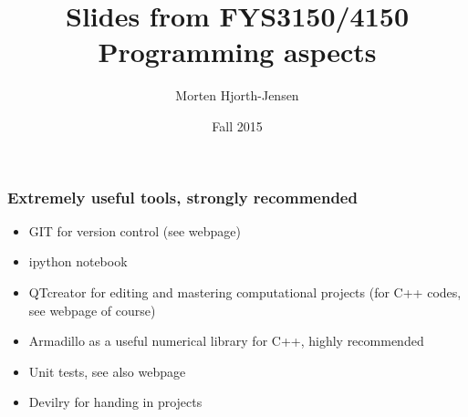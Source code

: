 \documentclass[handout]{beamer}
\newenvironment{block_mdfboxadmon}[1][]{\begin{block}{#1}}{\end{block}}
\begin{document}




\title{Slides from FYS3150/4150 Programming aspects}


\author{Morten Hjorth-Jensen}

\date{Fall 2015
}

\begin{frame}
\titlepage
\end{frame}

\begin{frame}
\frametitle{Extremely useful tools, strongly recommended}

\begin{block_mdfboxadmon}
\begin{itemize}
  \item GIT for version control (see webpage)

  \item ipython notebook

  \item QTcreator for editing and mastering computational projects (for C++ codes, see webpage of course)

  \item Armadillo as a useful numerical library for C++, highly recommended

  \item Unit tests, see also webpage

  \item Devilry for handing in projects
\end{itemize}

\noindent
\end{block_mdfboxadmon}
\end{frame}
\end{document}
